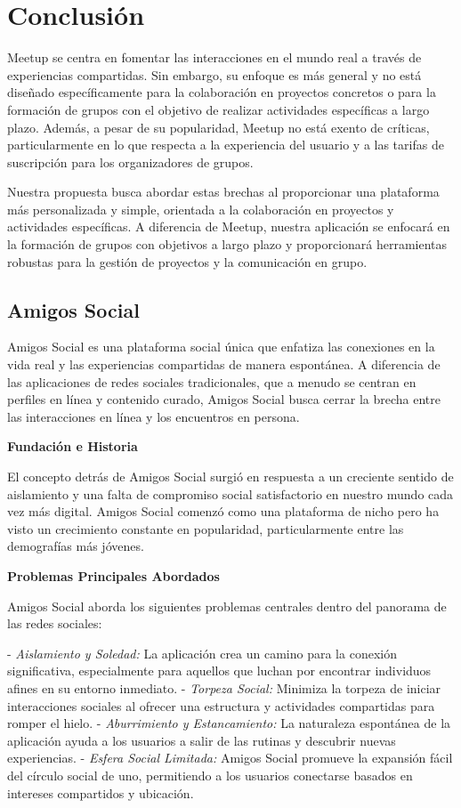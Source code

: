 \section{Conclusión}

Meetup se centra en fomentar las interacciones en el mundo real a 
través de experiencias compartidas. Sin embargo, su enfoque es más 
general y no está diseñado específicamente para la colaboración en 
proyectos concretos o para la formación de grupos con el objetivo de 
realizar actividades específicas a largo plazo. Además, a pesar de su 
popularidad, Meetup no está exento de críticas, particularmente en lo 
que respecta a la experiencia del usuario y a las tarifas de suscripción 
para los organizadores de grupos.

Nuestra propuesta busca abordar estas brechas al proporcionar una 
plataforma más personalizada y simple, orientada a la colaboración en proyectos y 
actividades específicas. A diferencia de Meetup, nuestra aplicación se 
enfocará en la formación de grupos con objetivos a largo plazo y proporcionará 
herramientas robustas para la gestión de proyectos y la comunicación en grupo.

\subsection{Amigos Social}
Amigos Social es una plataforma social única que enfatiza las conexiones en la vida real y las experiencias compartidas de manera espontánea. A diferencia de las aplicaciones de redes sociales tradicionales, que a menudo se centran en perfiles en línea y contenido curado, Amigos Social busca cerrar la brecha entre las interacciones en línea y los encuentros en persona.

\textbf{Fundación e Historia}

El concepto detrás de Amigos Social surgió en respuesta a un creciente sentido de aislamiento y una falta de compromiso social satisfactorio en nuestro mundo cada vez más digital. Amigos Social comenzó como una plataforma de nicho pero ha visto un crecimiento constante en popularidad, particularmente entre las demografías más jóvenes.

\textbf{Problemas Principales Abordados}

Amigos Social aborda los siguientes problemas centrales dentro del panorama de las redes sociales:

- \textit{Aislamiento y Soledad:} La aplicación crea un camino para la conexión significativa, especialmente para aquellos que luchan por encontrar individuos afines en su entorno inmediato.
- \textit{Torpeza Social:} Minimiza la torpeza de iniciar interacciones sociales al ofrecer una estructura y actividades compartidas para romper el hielo.
- \textit{Aburrimiento y Estancamiento:} La naturaleza espontánea de la aplicación ayuda a los usuarios a salir de las rutinas y descubrir nuevas experiencias.
- \textit{Esfera Social Limitada:} Amigos Social promueve la expansión fácil del círculo social de uno, permitiendo a los usuarios conectarse basados en intereses compartidos y ubicación.

